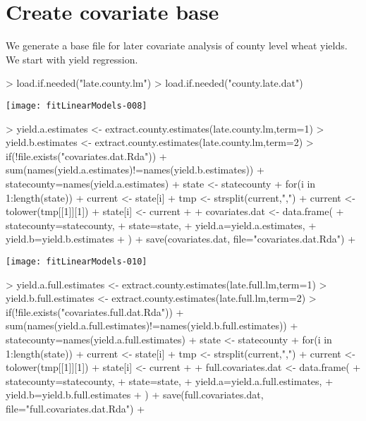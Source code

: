 \documentclass{report}
\begin{document}
\section{Create covariate base}
We generate a base file for later covariate analysis of county level wheat yields. We start with yield regression.
\begin{Schunk}
\begin{Sinput}
> load.if.needed("late.county.lm")
> load.if.needed("county.late.dat")
\end{Sinput}
\end{Schunk}

\texttt{[image: fitLinearModels-008]}


\begin{Schunk}
\begin{Sinput}
> yield.a.estimates <- extract.county.estimates(late.county.lm,term=1)
> yield.b.estimates <- extract.county.estimates(late.county.lm,term=2)
> if(!file.exists("covariates.dat.Rda")) {
+    sum(names(yield.a.estimates)!=names(yield.b.estimates))
+    statecounty=names(yield.a.estimates)
+    state <- statecounty
+    for(i in 1:length(state)) {
+       current <- state[i]
+       tmp <- strsplit(current,",")
+       current <- tolower(tmp[[1]][1])
+       state[i] <- current
+    }
+    covariates.dat <- data.frame(
+       statecounty=statecounty,
+       state=state,
+       yield.a=yield.a.estimates,
+       yield.b=yield.b.estimates
+       )
+    save(covariates.dat, file="covariates.dat.Rda")
+ }
\end{Sinput}
\end{Schunk}

\texttt{[image: fitLinearModels-010]}

\begin{Schunk}
\begin{Sinput}
> yield.a.full.estimates <- extract.county.estimates(late.full.lm,term=1)
> yield.b.full.estimates <- extract.county.estimates(late.full.lm,term=2)
> if(!file.exists("covariates.full.dat.Rda")) {
+    sum(names(yield.a.full.estimates)!=names(yield.b.full.estimates))
+    statecounty=names(yield.a.full.estimates)
+    state <- statecounty
+    for(i in 1:length(state)) {
+       current <- state[i]
+       tmp <- strsplit(current,",")
+       current <- tolower(tmp[[1]][1])
+       state[i] <- current
+    }
+    full.covariates.dat <- data.frame(
+       statecounty=statecounty,
+       state=state,
+       yield.a=yield.a.full.estimates,
+       yield.b=yield.b.full.estimates
+       )
+    save(full.covariates.dat, file="full.covariates.dat.Rda")
+ }
\end{Sinput}
\end{Schunk}
\end{document}
